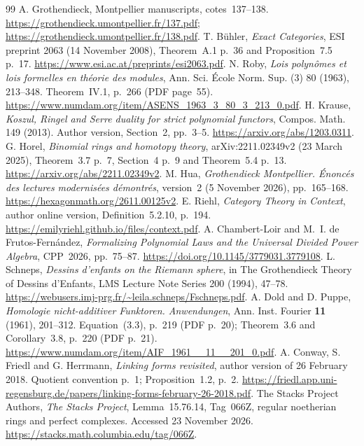 \documentclass[11pt,a4paper]{article}
\theoremstyle{definition}
\begin{document}
\begin{thebibliography}{99}
\small
{} A. Grothendieck, Montpellier manuscripts, cotes~137--138. \url{https://grothendieck.umontpellier.fr/137.pdf}; \url{https://grothendieck.umontpellier.fr/138.pdf}.
 T. B\"uhler, \emph{Exact Categories}, ESI preprint 2063 (14 November 2008), Theorem~A.1 p.~36 and Proposition~7.5 p.~17. \url{https://www.esi.ac.at/preprints/esi2063.pdf}.
 N. Roby, \emph{Lois polyn\^omes et lois formelles en th\'eorie des modules}, Ann. Sci. \'Ecole Norm. Sup. (3) 80 (1963), 213--348. Theorem~IV.1, p.~266 (PDF page~55). \url{https://www.numdam.org/item/ASENS_1963_3_80_3_213_0.pdf}.
 H. Krause, \emph{Koszul, Ringel and Serre duality for strict polynomial functors}, Compos. Math. 149 (2013). Author version, Section~2, pp.~3--5. \url{https://arxiv.org/abs/1203.0311}.
 G. Horel, \emph{Binomial rings and homotopy theory}, arXiv:2211.02349v2 (23 March 2025), Theorem~3.7 p.~7, Section~4 p.~9 and Theorem~5.4 p.~13. \url{https://arxiv.org/abs/2211.02349v2}.
 M. Hua, \emph{Grothendieck Montpellier. \'Enonc\'es des lectures modernis\'ees d\'emontr\'es}, version~2 (5 November 2026), pp.~165--168. \url{https://hexagonmath.org/2611.00125v2}.
 E. Riehl, \emph{Category Theory in Context}, author online version, Definition~5.2.10, p.~194. \url{https://emilyriehl.github.io/files/context.pdf}.
 A. Chambert-Loir and M.~I. de Frutos-Fern\'andez, \emph{Formalizing Polynomial Laws and the Universal Divided Power Algebra}, CPP~2026, pp.~75--87. \url{https://doi.org/10.1145/3779031.3779108}.
 L. Schneps, \emph{Dessins d'enfants on the Riemann sphere}, in The Grothendieck Theory of Dessins d'Enfants, LMS Lecture Note Series 200 (1994), 47--78. \url{https://webusers.imj-prg.fr/~leila.schneps/Fschneps.pdf}.
 A. Dold and D. Puppe, \emph{Homologie nicht-additiver Funktoren. Anwendungen}, Ann. Inst. Fourier \textbf{11} (1961), 201--312. Equation~(3.3), p.~219 (PDF p.~20); Theorem~3.6 and Corollary~3.8, p.~220 (PDF p.~21). \url{https://www.numdam.org/item/AIF_1961__11__201_0.pdf}.
 A. Conway, S. Friedl and G. Herrmann, \emph{Linking forms revisited}, author version of 26 February 2018. Quotient convention p.~1; Proposition~1.2, p.~2. \url{https://friedl.app.uni-regensburg.de/papers/linking-forms-february-26-2018.pdf}.
 The Stacks Project Authors, \emph{The Stacks Project}, Lemma~15.76.14, Tag~066Z, regular noetherian rings and perfect complexes. Accessed 23 November 2026. \url{https://stacks.math.columbia.edu/tag/066Z}.

\end{thebibliography}
\end{document}
